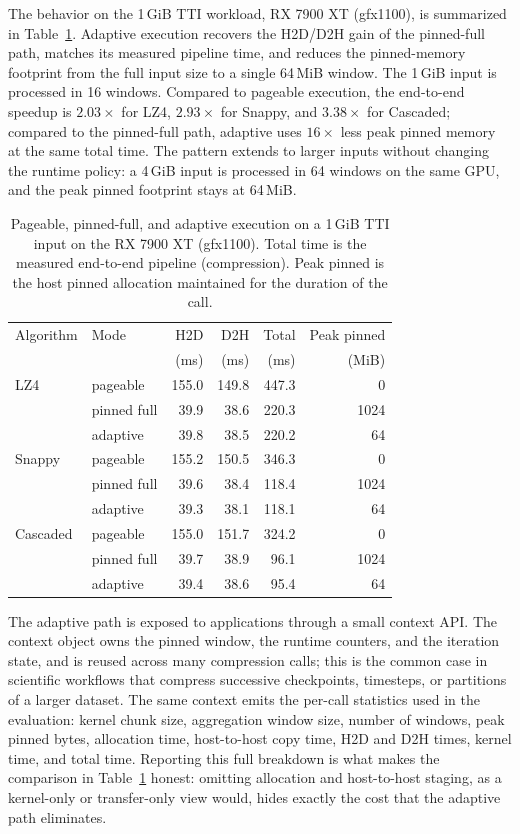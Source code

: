 The behavior on the 1\,GiB TTI workload, RX 7900 XT (gfx1100), is
summarized in Table~\ref{tab:adaptive-impact}. Adaptive execution
recovers the H2D/D2H gain of the pinned-full path, matches its
measured pipeline time, and reduces the pinned-memory footprint from
the full input size to a single 64\,MiB window. The 1\,GiB input is
processed in 16 windows. Compared to pageable execution, the
end-to-end speedup is $2.03\times$ for LZ4, $2.93\times$ for Snappy,
and $3.38\times$ for Cascaded; compared to the pinned-full path,
adaptive uses $16\times$ less peak pinned memory at the same total
time. The pattern extends to larger inputs without changing the
runtime policy: a 4\,GiB input is processed in 64 windows on the
same GPU, and the peak pinned footprint stays at 64\,MiB.

\begin{table}[t]
\centering
\caption{Pageable, pinned-full, and adaptive execution on a 1\,GiB
TTI input on the RX 7900 XT (gfx1100). Total time is the measured
end-to-end pipeline (compression). Peak pinned is the host pinned
allocation maintained for the duration of the call.}
\label{tab:adaptive-impact}
\small
\begin{tabular}{llrrrr}
\toprule
Algorithm & Mode & H2D & D2H & Total & Peak pinned \\
          &      & (ms) & (ms) & (ms) & (MiB) \\
\midrule
LZ4      & pageable     & 155.0 & 149.8 & 447.3 & 0 \\
         & pinned full  &  39.9 &  38.6 & 220.3 & 1024 \\
         & adaptive     &  39.8 &  38.5 & 220.2 & 64 \\
\midrule
Snappy   & pageable     & 155.2 & 150.5 & 346.3 & 0 \\
         & pinned full  &  39.6 &  38.4 & 118.4 & 1024 \\
         & adaptive     &  39.3 &  38.1 & 118.1 & 64 \\
\midrule
Cascaded & pageable     & 155.0 & 151.7 & 324.2 & 0 \\
         & pinned full  &  39.7 &  38.9 &  96.1 & 1024 \\
         & adaptive     &  39.4 &  38.6 &  95.4 & 64 \\
\bottomrule
\end{tabular}
\end{table}

The adaptive path is exposed to applications through a small context
API. The context object owns the pinned window, the runtime
counters, and the iteration state, and is reused across many
compression calls; this is the common case in scientific workflows
that compress successive checkpoints, timesteps, or partitions of a
larger dataset. The same context emits the per-call statistics used
in the evaluation: kernel chunk size, aggregation window size,
number of windows, peak pinned bytes, allocation time,
host-to-host copy time, H2D and D2H times, kernel time, and total
time. Reporting this full breakdown is what makes the comparison in
Table~\ref{tab:adaptive-impact} honest: omitting allocation and
host-to-host staging, as a kernel-only or transfer-only view would,
hides exactly the cost that the adaptive path eliminates.
